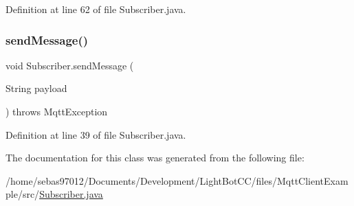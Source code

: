 Definition at line 62 of file Subscriber.\+java.

\mbox{\label{class_subscriber_a5cc61195bc5c75af73641d7f5b180bc3}} 
\subsubsection{\texorpdfstring{send\+Message()}{sendMessage()}}
{\footnotesize\ttfamily void Subscriber.\+send\+Message (\begin{DoxyParamCaption}\item[{String}]{payload }\end{DoxyParamCaption}) throws Mqtt\+Exception\hspace{0.3cm}{\ttfamily [inline]}}



Definition at line 39 of file Subscriber.\+java.



The documentation for this class was generated from the following file\+:\begin{DoxyCompactItemize}
\item 
/home/sebas97012/\+Documents/\+Development/\+Light\+Bot\+C\+C/files/\+Mqtt\+Client\+Example/src/\mbox{\hyperlink{files_2_mqtt_client_example_2src_2_subscriber_8java}{Subscriber.\+java}}\end{DoxyCompactItemize}
